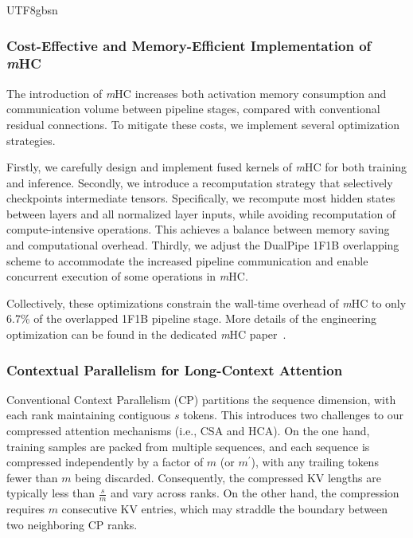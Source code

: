 \documentclass[11pt, a4paper, logo, copyright, nonumbering]{deepseek}
\newcommand{\mhc}{\textit{m}HC}
\newcommand{\hca}{HCA}
\newcommand{\csa}{CSA}
\begin{document}
\begin{CJK*}{UTF8}{gbsn}
\subsubsection{Cost-Effective and Memory-Efficient Implementation of \mhc{}}
The introduction of \mhc{} increases both activation memory consumption and communication volume between pipeline stages, compared with conventional residual connections.
To mitigate these costs, we implement several optimization strategies.

Firstly, we carefully design and implement fused kernels of \mhc{} for both training and inference.
Secondly, we introduce a recomputation strategy that selectively checkpoints intermediate tensors. 
Specifically, we recompute most hidden states between layers and all normalized layer inputs, while avoiding recomputation of compute-intensive operations. 
This achieves a balance between memory saving and computational overhead. 
Thirdly, we adjust the DualPipe 1F1B overlapping scheme to accommodate the increased pipeline communication and enable concurrent execution of some operations in \mhc{}.

Collectively, these optimizations constrain the wall-time overhead of \mhc{} to only 6.7\% of the overlapped 1F1B pipeline stage. 
More details of the engineering optimization can be found in the dedicated \mhc{} paper~\citep{mhc}.


\subsubsection{Contextual Parallelism for Long-Context Attention}
Conventional Context Parallelism (CP) partitions the sequence dimension, with each rank maintaining contiguous $s$ tokens. 
This introduces two challenges to our compressed attention mechanisms (i.e., \csa{} and \hca{}). 
On the one hand, training samples are packed from multiple sequences, and each sequence is compressed independently by a factor of $m$ (or $m^{\prime}$), with any trailing tokens fewer than $m$ being discarded. 
Consequently, the compressed KV lengths are typically less than $\frac{s}{m}$ and vary across ranks. 
On the other hand, the compression requires $m$ consecutive KV entries, which may straddle the boundary between two neighboring CP ranks.


\end{CJK*}
\end{document}
